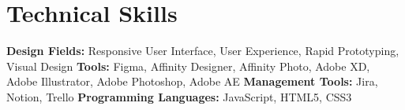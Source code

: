 \section*{Technical Skills}
%
%
%
\begin{tasks}
  \task \textbf{Design Fields:} Responsive User Interface, User Experience, Rapid Prototyping, Visual Design
  \task \textbf{Tools:} Figma, Affinity Designer, Affinity Photo, Adobe XD, Adobe Illustrator, Adobe Photoshop, Adobe AE
  \task \textbf{Management Tools:} Jira, Notion, Trello
  \task \textbf{Programming Languages:} JavaScript, HTML5, CSS3
\end{tasks}